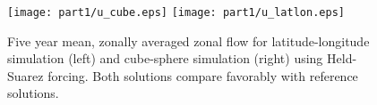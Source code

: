 \begin{figure}
 \begin{center}
   \texttt{[image: part1/u\_cube.eps]}
   \texttt{[image: part1/u\_latlon.eps]}
 \end{center}
\caption{Five year mean, zonally averaged zonal flow for latitude-longitude
simulation (left) and cube-sphere simulation (right) using Held-Suarez
forcing. Both solutions compare favorably with reference solutions.}
\label{fig:hs_zave_u}
\end{figure}
